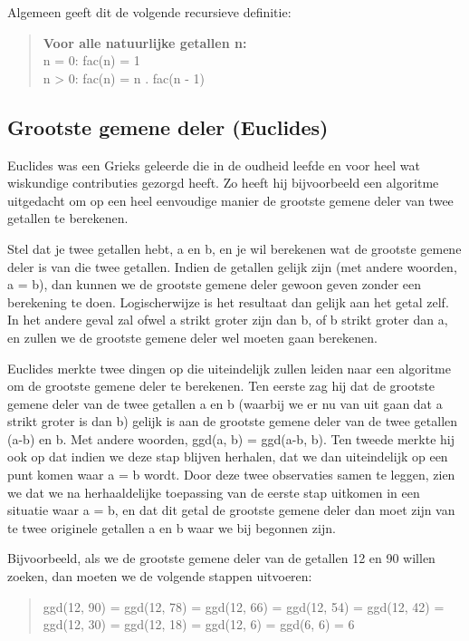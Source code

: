 Algemeen geeft dit de volgende recursieve definitie:

\begin{quote}
\textbf{Voor alle natuurlijke getallen n:} \\
n = 0:  fac(n) = 1 \\
n > 0:  fac(n) = n . fac(n - 1)
\end{quote}

\subsection{Grootste gemene deler (Euclides)}

Euclides was een Grieks geleerde die in de oudheid leefde en voor heel wat wiskundige contributies gezorgd heeft. Zo heeft hij bijvoorbeeld een algoritme uitgedacht om op een heel eenvoudige manier de grootste gemene deler van twee getallen te berekenen.

Stel dat je twee getallen hebt, a en b, en je wil berekenen wat de grootste gemene deler is van die twee getallen. Indien de getallen gelijk zijn (met andere woorden, a = b), dan kunnen we de grootste gemene deler gewoon geven zonder een berekening te doen. Logischerwijze is het resultaat dan gelijk aan het getal zelf. In het andere geval zal ofwel a strikt groter zijn dan b, of b strikt groter dan a, en zullen we de grootste gemene deler wel moeten gaan berekenen.

Euclides merkte twee dingen op die uiteindelijk zullen leiden naar een algoritme om de grootste gemene deler te berekenen. Ten eerste zag hij dat de grootste gemene deler van de twee getallen a en b (waarbij we er nu van uit gaan dat a strikt groter is dan b) gelijk is aan de grootste gemene deler van de twee getallen (a-b) en b. Met andere woorden, ggd(a, b) = ggd(a-b, b). Ten tweede merkte hij ook op dat indien we deze stap blijven herhalen, dat we dan uiteindelijk op een punt komen waar a = b wordt. Door deze twee observaties samen te leggen, zien we dat we na herhaaldelijke toepassing van de eerste stap uitkomen in een situatie waar a = b, en dat dit getal de grootste gemene deler dan moet zijn van te twee originele getallen a en b waar we bij begonnen zijn.

Bijvoorbeeld, als we de grootste gemene deler van de getallen 12 en 90 willen zoeken, dan moeten we de volgende stappen uitvoeren:

\begin{quote}
ggd(12, 90) = ggd(12, 78) = ggd(12, 66) = ggd(12, 54) = ggd(12, 42) = ggd(12, 30) = ggd(12, 18) = ggd(12, 6) = ggd(6, 6) = 6
\end{quote}

